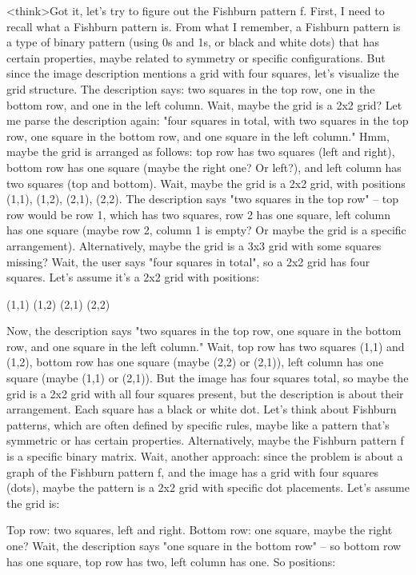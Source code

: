 <think>Got it, let's try to figure out the Fishburn pattern f. First, I need to recall what a Fishburn pattern is. From what I remember, a Fishburn pattern is a type of binary pattern (using 0s and 1s, or black and white dots) that has certain properties, maybe related to symmetry or specific configurations. But since the image description mentions a grid with four squares, let's visualize the grid structure. The description says: two squares in the top row, one in the bottom row, and one in the left column. Wait, maybe the grid is a 2x2 grid? Let me parse the description again: "four squares in total, with two squares in the top row, one square in the bottom row, and one square in the left column." Hmm, maybe the grid is arranged as follows: top row has two squares (left and right), bottom row has one square (maybe the right one? Or left?), and left column has two squares (top and bottom). Wait, maybe the grid is a 2x2 grid, with positions (1,1), (1,2), (2,1), (2,2). The description says "two squares in the top row" – top row would be row 1, which has two squares, row 2 has one square, left column has one square (maybe row 2, column 1 is empty? Or maybe the grid is a specific arrangement). Alternatively, maybe the grid is a 3x3 grid with some squares missing? Wait, the user says "four squares in total", so a 2x2 grid has four squares. Let's assume it's a 2x2 grid with positions:

(1,1) (1,2)
(2,1) (2,2)

Now, the description says "two squares in the top row, one square in the bottom row, and one square in the left column." Wait, top row has two squares (1,1) and (1,2), bottom row has one square (maybe (2,2) or (2,1)), left column has one square (maybe (1,1) or (2,1)). But the image has four squares total, so maybe the grid is a 2x2 grid with all four squares present, but the description is about their arrangement. Each square has a black or white dot. Let's think about Fishburn patterns, which are often defined by specific rules, maybe like a pattern that's symmetric or has certain properties. Alternatively, maybe the Fishburn pattern f is a specific binary matrix. Wait, another approach: since the problem is about a graph of the Fishburn pattern f, and the image has a grid with four squares (dots), maybe the pattern is a 2x2 grid with specific dot placements. Let's assume the grid is:

Top row: two squares, left and right.
Bottom row: one square, maybe the right one? Wait, the description says "one square in the bottom row" – so bottom row has one square, top row has two, left column has one. So positions:

